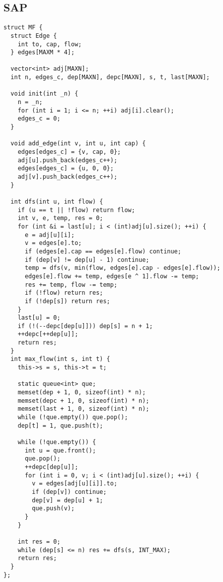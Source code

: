 \documentclass[twoside]{article}
\begin{document}
\subsection{SAP}
\begin{lstlisting}
struct MF {
  struct Edge {
    int to, cap, flow;
  } edges[MAXM * 4];

  vector<int> adj[MAXN];
  int n, edges_c, dep[MAXN], depc[MAXN], s, t, last[MAXN];

  void init(int _n) {
    n = _n;
    for (int i = 1; i <= n; ++i) adj[i].clear();
    edges_c = 0;
  }

  void add_edge(int v, int u, int cap) {
    edges[edges_c] = {v, cap, 0};
    adj[u].push_back(edges_c++);
    edges[edges_c] = {u, 0, 0};
    adj[v].push_back(edges_c++);
  }

  int dfs(int u, int flow) {
    if (u == t || !flow) return flow;
    int v, e, temp, res = 0;
    for (int &i = last[u]; i < (int)adj[u].size(); ++i) {
      e = adj[u][i];
      v = edges[e].to;
      if (edges[e].cap == edges[e].flow) continue;
      if (dep[v] != dep[u] - 1) continue;
      temp = dfs(v, min(flow, edges[e].cap - edges[e].flow));
      edges[e].flow += temp, edges[e ^ 1].flow -= temp;
      res += temp, flow -= temp;
      if (!flow) return res;
      if (!dep[s]) return res;
    }
    last[u] = 0;
    if (!(--depc[dep[u]])) dep[s] = n + 1;
    ++depc[++dep[u]];
    return res;
  }
  int max_flow(int s, int t) {
    this->s = s, this->t = t;

    static queue<int> que;
    memset(dep + 1, 0, sizeof(int) * n);
    memset(depc + 1, 0, sizeof(int) * n);
    memset(last + 1, 0, sizeof(int) * n);
    while (!que.empty()) que.pop();
    dep[t] = 1, que.push(t);

    while (!que.empty()) {
      int u = que.front();
      que.pop();
      ++depc[dep[u]];
      for (int i = 0, v; i < (int)adj[u].size(); ++i) {
        v = edges[adj[u][i]].to;
        if (dep[v]) continue;
        dep[v] = dep[u] + 1;
        que.push(v);
      }
    }

    int res = 0;
    while (dep[s] <= n) res += dfs(s, INT_MAX);
    return res;
  }
};

\end{lstlisting}
\end{document}
